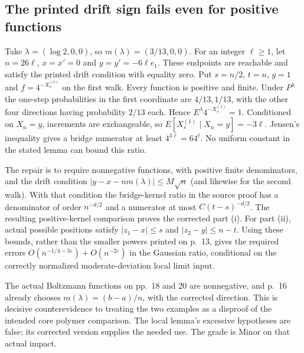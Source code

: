\documentclass[10pt]{article}
\begin{document}
\subsection*{The printed drift sign fails even for positive functions}
Take \(\lambda=(\log2,0,0)\), so \(m(\lambda)=(3/13,0,0)\). For an integer \(\ell\geq1\), let \(n=26\ell\), \(x=x'=0\) and \(y=y'=-6\ell e_1\). These endpoints are reachable and satisfy the printed drift condition with equality zero. Put \(s=n/2\), \(t=n\), \(g=1\) and \(f=4^{-X_s^{(1)}}\) on the first walk. Every function is positive and finite. Under \(P^\lambda\) the one-step probabilities in the first coordinate are \(4/13,1/13\), with the other four directions having probability \(2/13\) each. Hence \(E^\lambda4^{-X_s^{(1)}}=1\). Conditioned on \(X_n=y\), increments are exchangeable, so \(E[X_s^{(1)}\mid X_n=y]=-3\ell\). Jensen’s inequality gives a bridge numerator at least \(4^{3\ell}=64^\ell\). No uniform constant in the stated lemma can bound this ratio.\par
The repair is to require nonnegative functions, with positive finite denominators, and the drift condition \(|y-x-nm(\lambda)|\leq M\sqrt n\) (and likewise for the second walk). With that condition the bridge-kernel ratio in the source proof has a denominator of order \(n^{-d/2}\) and a numerator at most \(C(t-s)^{-d/2}\). The resulting positive-kernel comparison proves the corrected part (i). For part (ii), actual possible positions satisfy \(|z_1-x|\leq s\) and \(|z_2-y|\leq n-t\). Using these bounds, rather than the smaller powers printed on p. 13, gives the required errors \(O(n^{-1/4-3\varepsilon})+O(n^{-2\varepsilon})\) in the Gaussian ratio, conditional on the correctly normalized moderate-deviation local limit input.\par
The actual Boltzmann functions on pp. 18 and 20 are nonnegative, and p. 16 already chooses \(m(\lambda)=(b-a)/n\), with the corrected direction. This is decisive counterevidence to treating the two examples as a disproof of the intended core polymer comparison. The local lemma’s excessive hypotheses are false; its corrected version supplies the needed use. The grade is Minor on that actual impact.\par
\end{document}
